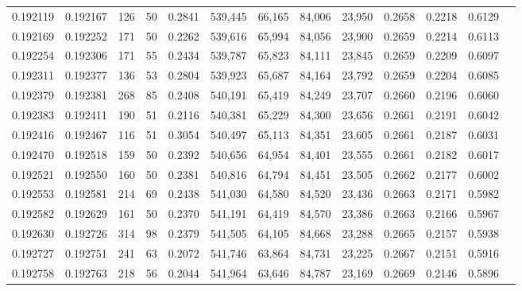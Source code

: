 \begin{tabular}{rrrrrrrrrrrrr}
0.192119 & 0.192167 &   126 &  50 &                                     0.2841 & 539,445 &  66,165 &  84,006 &  23,950 & 0.2658 & 0.2218 & 0.6129 \\
0.192169 & 0.192252 &   171 &  50 &                                     0.2262 & 539,616 &  65,994 &  84,056 &  23,900 & 0.2659 & 0.2214 & 0.6113 \\
0.192254 & 0.192306 &   171 &  55 &                                     0.2434 & 539,787 &  65,823 &  84,111 &  23,845 & 0.2659 & 0.2209 & 0.6097 \\
0.192311 & 0.192377 &   136 &  53 &                                     0.2804 & 539,923 &  65,687 &  84,164 &  23,792 & 0.2659 & 0.2204 & 0.6085 \\
0.192379 & 0.192381 &   268 &  85 &                                     0.2408 & 540,191 &  65,419 &  84,249 &  23,707 & 0.2660 & 0.2196 & 0.6060 \\
0.192383 & 0.192411 &   190 &  51 &                                     0.2116 & 540,381 &  65,229 &  84,300 &  23,656 & 0.2661 & 0.2191 & 0.6042 \\
0.192416 & 0.192467 &   116 &  51 &                                     0.3054 & 540,497 &  65,113 &  84,351 &  23,605 & 0.2661 & 0.2187 & 0.6031 \\
0.192470 & 0.192518 &   159 &  50 &                                     0.2392 & 540,656 &  64,954 &  84,401 &  23,555 & 0.2661 & 0.2182 & 0.6017 \\
0.192521 & 0.192550 &   160 &  50 &                                     0.2381 & 540,816 &  64,794 &  84,451 &  23,505 & 0.2662 & 0.2177 & 0.6002 \\
0.192553 & 0.192581 &   214 &  69 &                                     0.2438 & 541,030 &  64,580 &  84,520 &  23,436 & 0.2663 & 0.2171 & 0.5982 \\
0.192582 & 0.192629 &   161 &  50 &                                     0.2370 & 541,191 &  64,419 &  84,570 &  23,386 & 0.2663 & 0.2166 & 0.5967 \\
0.192630 & 0.192726 &   314 &  98 &                                     0.2379 & 541,505 &  64,105 &  84,668 &  23,288 & 0.2665 & 0.2157 & 0.5938 \\
0.192727 & 0.192751 &   241 &  63 &                                     0.2072 & 541,746 &  63,864 &  84,731 &  23,225 & 0.2667 & 0.2151 & 0.5916 \\
0.192758 & 0.192763 &   218 &  56 &                                     0.2044 & 541,964 &  63,646 &  84,787 &  23,169 & 0.2669 & 0.2146 & 0.5896 \\

\end{tabular}
